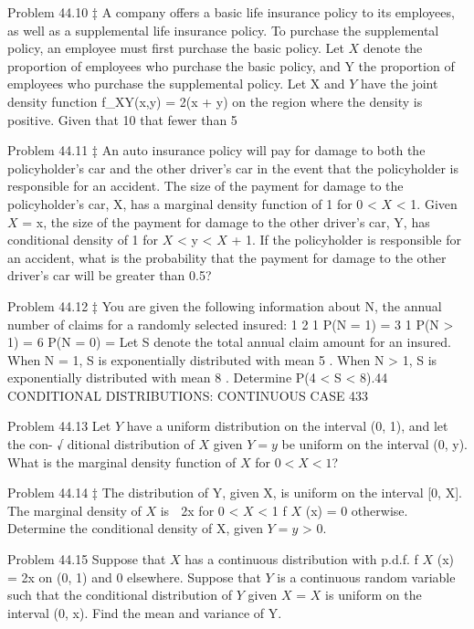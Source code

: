 Problem 44.10 ‡
A company offers a basic life insurance policy to its employees, as well as a
supplemental life insurance policy. To purchase the supplemental policy, an
employee must first purchase the basic policy.
Let $X$ denote the proportion of employees who purchase the basic policy, and
Y the proportion of employees who purchase the supplemental policy. Let
X and $Y$ have the joint density function f_{XY}(x,y) = 2(x + y) on the region
where the density is positive.
Given that 10%
that fewer than 5%



Problem 44.11 ‡
An auto insurance policy will pay for damage to both the policyholder’s car
and the other driver’s car in the event that the policyholder is responsible
for an accident. The size of the payment for damage to the policyholder’s
car, X, has a marginal density function of 1 for 0 < $X$ < 1. Given $X$ = x, the
size of the payment for damage to the other driver’s car, Y, has conditional
density of 1 for $X$ < y < $X$ + 1.
If the policyholder is responsible for an accident, what is the probability that
the payment for damage to the other driver’s car will be greater than 0.5?



Problem 44.12 ‡
You are given the following information about N, the annual number of
claims for a randomly selected insured:
1
2
1
P(N = 1) =
3
1
P(N > 1) =
6
P(N = 0) =
Let S denote the total annual claim amount for an insured. When N = 1, S
is exponentially distributed with mean 5 . When N > 1, S is exponentially
distributed with mean 8 . Determine P(4 < S < 8).44 CONDITIONAL DISTRIBUTIONS: CONTINUOUS CASE
433



Problem 44.13
Let $Y$ have a uniform distribution on the interval (0, 1), and let the con-
√
ditional distribution of $X$ given $Y = y$ be uniform on the interval (0, y).
What is the marginal density function of $X$ for $0 < X < 1$?



Problem 44.14 ‡
The distribution of Y, given X, is uniform on the interval [0, X]. The marginal
density of $X$ is

2x for 0 < $X$ < 1
f $X$ (x) =
0
otherwise.
Determine the conditional density of X, given $Y = y$ > 0.



Problem 44.15
Suppose that $X$ has a continuous distribution with p.d.f. f $X$ (x) = 2x on
(0, 1) and 0 elsewhere. Suppose that $Y$ is a continuous random variable such
that the conditional distribution of $Y$ given $X$ = $X$ is uniform on the interval
(0, x). Find the mean and variance of Y.



